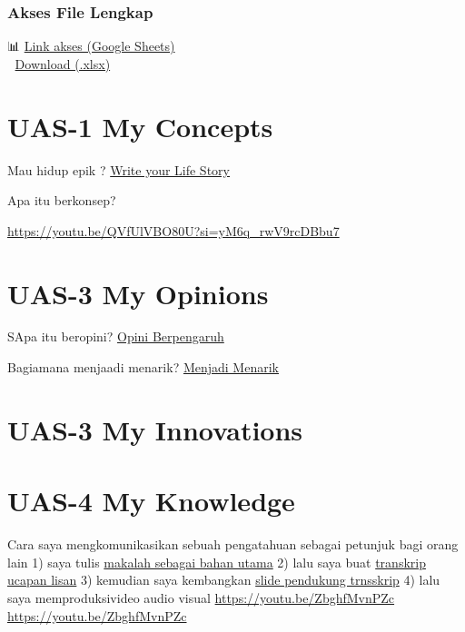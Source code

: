 \documentclass[
  letterpaper,
  DIV=11,
  numbers=noendperiod]{scrreprt}
\begin{document}
\subsection{Akses File Lengkap}\label{akses-file-lengkap}

📊
\href{https://docs.google.com/spreadsheets/d/1PXUEv_vhknGI6II4tAm2Ne86nR38YApk/edit?usp=sharing&ouid=107100021711431996550&rtpof=true&sd=true}{Link
akses (Google Sheets)}\\
📂 \href{18224049_UTS-5_Skor.xlsx}{Download (.xlsx)}


\chapter{UAS-1 My Concepts}\label{uas-1-my-concepts}

Mau hidup epik ? \href{lifestory.pdf}{Write your Life Story}

Apa itu berkonsep?

\url{https://youtu.be/QVfUlVBO80U?si=yM6q_rwV9rcDBbu7}


\chapter{UAS-3 My Opinions}\label{uas-3-my-opinions}

SApa itu beropini? \href{BM\%20Opini.mp4}{Opini Berpengaruh}

Bagiamana menjaadi menarik? \href{./Interesting.mp4}{Menjadi Menarik}


\chapter{UAS-3 My Innovations}\label{uas-3-my-innovations}


\chapter{UAS-4 My Knowledge}\label{uas-4-my-knowledge}

Cara saya mengkomunikasikan sebuah pengatahuan sebagai petunjuk bagi
orang lain 1) saya tulis
\href{Rekomendasi\%20Presentasi\%20Efektif(Contoh\%20Makalah).pdf}{makalah
sebagai bahan utama} 2) lalu saya buat
\href{Contoh\%20Transkrip\%20Presentasi.pdf}{transkrip ucapan lisan} 3)
kemudian saya kembangkan
\href{Rekomendasi\%20Presentasi\%20(Contoh\%20Slides).pdf}{slide
pendukung trnsskrip} 4) lalu saya memproduksivideo audio visual
\url{https://youtu.be/ZbghfMvnPZc} \url{https://youtu.be/ZbghfMvnPZc}
\end{document}
